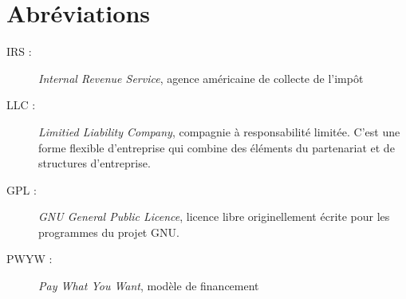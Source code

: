 \chapter*{Abréviations}

\begin{description}
    \item[IRS :] \emph{Internal Revenue Service}, agence américaine de collecte
    de l'impôt
    \item[LLC : ] \emph{Limitied Liability Company}, compagnie à
        responsabilité limitée. C'est une forme flexible d'entreprise qui
        combine des éléments du partenariat et de structures d'entreprise.
    \item[GPL : ] \emph{GNU General Public Licence}, licence libre
    originellement écrite pour les programmes du projet GNU.  \item[PWYW :]
        \emph{Pay What You Want}, modèle de financement
\end{description}
